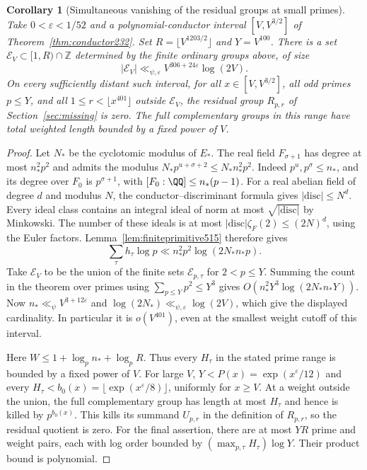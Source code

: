 \documentclass[a4paper,11pt]{article}
\newtheorem{corollary}[proposition]{Corollary}
\theoremstyle{definition}
\theoremstyle{remark}
\newcommand{\ZZ}{\mathbb Z}\newcommand{\ord}{\operatorname{ord}}
\numberwithin{equation}{section}
\begin{document}
\begin{corollary}[Simultaneous vanishing of the residual groups at small primes]
\leavevmode\label{cor:smallresidual515}
Take \(0<\varepsilon<1/52\) and a polynomial-conductor interval
\([V,V^{3/2}]\) of Theorem~\ref{thm:conductor232}. Set
\(R=\lfloor V^{1203/2}\rfloor\) and \(Y=V^{100}\).
There is a set \(\mathcal E_V\subset[1,R)\cap\ZZ\) determined by
the finite ordinary groups above, of size
\[
 |\mathcal E_V|\ll_{\psi,\varepsilon}
            V^{306+24\varepsilon}\log(2V).
\]
On every sufficiently distant such interval, for all
\(x\in[V,V^{3/2}]\), all odd primes \(p\le Y\), and all
\(1\le r<\lfloor x^{401}\rfloor\) outside \(\mathcal E_V\),
the residual group \(R_{p,r}\) of Section~\ref{sec:missing}
is zero. The full complementary groups in this range have total
weighted length bounded by a fixed power of \(V\).
\end{corollary}
\begin{proof}
Let \(N_*\) be the cyclotomic modulus of \(E_*\). The real field
\(F_{\sigma+1}\) has degree at most \(n_*^2p^2\) and admits the
modulus \(N_*p^{u+\sigma+2}\le N_* n_*^2 p^2\).
Indeed \(p^u,p^\sigma\le n_*\), and its degree over \(F_0\)
is \(p^{\sigma+1}\), with \([F_0:\QQ]\le n_*(p-1)\).
For a real abelian field of degree \(d\) and modulus \(N\), the
conductor--discriminant formula gives \(|\mathrm{disc}|\le N^d\).
Every ideal class contains an integral ideal of norm at most
\(\sqrt{|\mathrm{disc}|}\) by Minkowski. The number of these
ideals is at most \(|\mathrm{disc}|\zeta_F(2)\le(2N)^d\),
using the Euler factors. Lemma~\ref{lem:finiteprimitive515}
therefore gives
\[
   \sum_\tau h_\tau\log p
      \ll n_*^2p^2\log(2N_*n_*p).
\]
Take \(\mathcal E_V\) to be the union of the finite sets
\(\mathcal E_{p,\tau}\) for \(2<p\le Y\). Summing the count in
the theorem over primes using \(\sum_{p\le Y}p^2\le Y^3\) gives
\(O(n_*^2Y^3\log(2N_*n_*Y))\). Now
\(n_*\ll_\psi V^{3+12\varepsilon}\) and
\(\log(2N_*)\ll_{\psi,\varepsilon}\log(2V)\), which give the
displayed cardinality. In particular it is \(o(V^{401})\),
even at the smallest weight cutoff of this interval.

Here \(W\le1+\log_p n_*+\log_p R\). Thus every \(H_\tau\)
in the stated prime range is bounded by a fixed power of \(V\).
For large \(V\), \(Y<P(x)=\exp(x^\varepsilon/12)\) and every
\(H_\tau<b_0(x)=\lfloor\exp(x^\varepsilon/8)\rfloor\), uniformly
for \(x\ge V\). At a weight outside the union, the full
complementary group has length at most \(H_\tau\) and hence is
killed by \(p^{b_0(x)}\). This kills its summand \(U_{p,r}\) in
the definition of \(R_{p,r}\), so the residual quotient is zero.
For the final assertion, there are at most \(YR\) prime and
weight pairs, each with log order bounded by
\((\max_{p,\tau}H_\tau)\log Y\). Their product bound is polynomial.
\end{proof}
\end{document}
